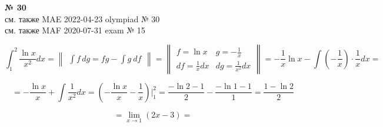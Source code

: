\documentclass{article}
\begin{document}
\textbf{№ 30} 
\\
см. также {\color{red}MAE} 2022-04-23 olympiad № 30 \\
см. также {\color{blue}MAF} 2020-07-31 exam № 15

$$ \int_{1}^{2} \frac{\ln{x}}{x^2} dx 
= \begin{Vmatrix} \int f \,dg = fg - \int g \ df \end{Vmatrix} 
= \begin{Vmatrix} f = \ln{x} &  g = -\frac{1}{x} \\
                 df = \frac{1}{x}dx  & dg = \frac{1}{x^2} dx \end{Vmatrix} 
= -\frac{1}{x} \ln{x} - \int \left( -\frac{1}{x} \right) \cdot \frac{1}{x} dx 
= $$

$$ = -\frac{\ln{x}}{x} + \int\frac{1}{x^2} dx 
= \left( -\frac{\ln{x}}{x} - \frac{1}{x} \right) \bigg\vert_{1}^{2} 
= \frac{-\ln{2}-1}{2} - \frac{-\ln{1}-1}{1}
= \frac{1-\ln{2}}{2}$$

$$ = \lim\limits_{x\to 1} \left( 2x-3 \right)
= $$
\end{document}
